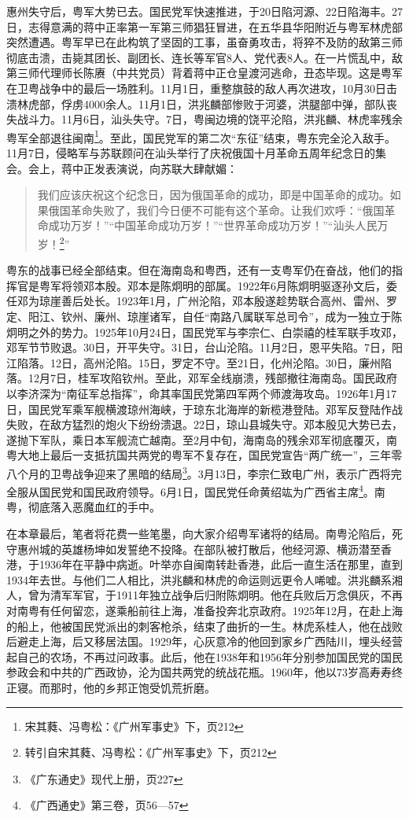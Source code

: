 惠州失守后，粤军大势已去。国民党军快速推进，于20日陷河源、22日陷海丰。27日，志得意满的蒋中正率第一军第三师猖狂冒进，在五华县华阳附近与粤军林虎部突然遭遇。粤军早已在此构筑了坚固的工事，虽奋勇攻击，将猝不及防的敌第三师彻底击溃，击毙其团长、副团长、连长等军官8人、党代表8人。在一片慌乱中，敌第三师代理师长陈赓（中共党员）背着蒋中正仓皇渡河逃命，丑态毕现。这是粤军在卫粤战争中的最后一场胜利。11月1日，重整旗鼓的敌人再次进攻，10月30日击溃林虎部，俘虏4000余人。11月1日，洪兆麟部惨败于河婆，洪腿部中弹，部队丧失战斗力。11月6日，汕头失守。7日，粤闽边境的饶平沦陷，洪兆麟、林虎率残余粤军全部退往闽南\footnote{宋其蕤、冯粤松：《广州军事史》下，页212}。至此，国民党军的第二次“东征”结束，粤东完全沦入敌手。
11月7日，侵略军与苏联顾问在汕头举行了庆祝俄国十月革命五周年纪念日的集会。会上，蒋中正发表演说，向苏联大肆献媚：

\begin{quote}

我们应该庆祝这个纪念日，因为俄国革命的成功，即是中国革命的成功。如果俄国革命失败了，我们今日便不可能有这个革命。让我们欢呼：“俄国革命成功万岁！”“中国革命成功万岁！”“世界革命成功万岁！”“汕头人民万岁！\footnote{转引自宋其蕤、冯粤松：《广州军事史》下，页212}”

\end{quote}

粤东的战事已经全部结束。但在海南岛和粤西，还有一支粤军仍在奋战，他们的指挥官是粤军将领邓本殷。邓本是陈炯明的部属。1922年6月陈炯明驱逐孙文后，委任邓为琼崖善后处长。1923年1月，广州沦陷，邓本殷遂趁势联合高州、雷州、罗定、阳江、钦州、廉州、琼崖诸军，自任“南路八属联军总司令”，成为一独立于陈炯明之外的势力。1925年10月24日，国民党军与李宗仁、白崇禧的桂军联手攻邓，邓军节节败退。30日，开平失守。31日，台山沦陷。11月2日，恩平失陷。7日，阳江陷落。12日，高州沦陷。15日，罗定不守。至21日，化州沦陷。30日，廉州陷落。12月7日，桂军攻陷钦州。至此，邓军全线崩溃，残部撤往海南岛。国民政府以李济深为“南征军总指挥”，命其率国民党第四军两个师渡海攻岛。1926年1月17日，国民党军乘军舰横渡琼州海峡，于琼东北海岸的新榄港登陆。邓军反登陆作战失败，在敌方猛烈的炮火下纷纷溃退。22日，琼山县城失守。邓本殷见大势已去，遂抛下军队，乘日本军舰流亡越南。至2月中旬，海南岛的残余邓军彻底覆灭，南粤大地上最后一支抵抗国共两党的粤军不复存在，国民党宣告“两广统一”，三年零八个月的卫粤战争迎来了黑暗的结局\footnote{《广东通史》现代上册，页227}。3月13日，李宗仁致电广州，表示广西将完全服从国民党和国民政府领导。6月1日，国民党任命黄绍竑为广西省主席\footnote{《广西通史》第三卷，页56—57}。南粤，彻底落入恶魔血红的手中。

在本章最后，笔者将花费一些笔墨，向大家介绍粤军诸将的结局。南粤沦陷后，死守惠州城的英雄杨坤如发誓绝不投降。在部队被打散后，他经河源、横沥潜至香港，于1936年在平静中病逝。叶举亦自闽南转赴香港，此后一直生活在那里，直到1934年去世。与他们二人相比，洪兆麟和林虎的命运则远更令人唏嘘。洪兆麟系湘人，曾为清军军官，于1911年独立战争后归附陈炯明。他在兵败后万念俱灰，不再对南粤有任何留恋，遂乘船前往上海，准备投奔北京政府。1925年12月，在赴上海的船上，他被国民党派出的刺客枪杀，结束了曲折的一生。林虎系桂人，他在战败后避走上海，后又移居法国。1929年，心灰意冷的他回到家乡广西陆川，埋头经营起自己的农场，不再过问政事。此后，他在1938年和1956年分别参加国民党的国民参政会和中共的广西政协，沦为国共两党的统战花瓶。1960年，他以73岁高寿寿终正寝。而那时，他的乡邦正饱受饥荒折磨。

